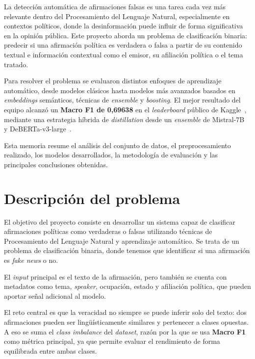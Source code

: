 \documentclass[12pt,a4paper]{article}
\begin{document}
La detección automática de afirmaciones falsas es una tarea cada vez más relevante dentro del Procesamiento del Lenguaje Natural, especialmente en contextos políticos, donde la desinformación puede influir de forma significativa en la opinión pública. Este proyecto aborda un problema de clasificación binaria: predecir si una afirmación política es verdadera o falsa a partir de su contenido textual e información contextual como el emisor, su afiliación política o el tema tratado.

Para resolver el problema se evaluaron distintos enfoques de aprendizaje automático, desde modelos clásicos hasta modelos más avanzados basados en \emph{embeddings} semánticos, técnicas de \emph{ensemble} y \emph{boosting}. El mejor resultado del equipo alcanzó un \textbf{Macro F1 de 0,69638} en el \emph{leaderboard} público de Kaggle~\cite{kaggle}, mediante una estrategia híbrida de \emph{distillation} desde un \emph{ensemble} de Mistral-7B~\cite{mistral} y DeBERTa-v3-large~\cite{deberta}.

Esta memoria resume el análisis del conjunto de datos, el preprocesamiento realizado, los modelos desarrollados, la metodología de evaluación y las principales conclusiones obtenidas.

\section{Descripción del problema}

El objetivo del proyecto consiste en desarrollar un sistema capaz de clasificar afirmaciones políticas como verdaderas o falsas utilizando técnicas de Procesamiento del Lenguaje Natural y aprendizaje automático. Se trata de un problema de clasificación binaria, donde tenemos que identificar si una afirmación es \emph{fake news} o no.

El \emph{input} principal es el texto de la afirmación, pero también se cuenta con metadatos como tema, \emph{speaker}, ocupación, estado y afiliación política, que pueden aportar señal adicional al modelo.

El reto central es que la veracidad no siempre se puede inferir solo del texto: dos afirmaciones pueden ser lingüísticamente similares y pertenecer a clases opuestas. A eso se suma el \emph{class imbalance} del \emph{dataset}, razón por la que se usa \textbf{Macro F1} como métrica principal, ya que permite evaluar el rendimiento de forma equilibrada entre ambas clases.
\end{document}
